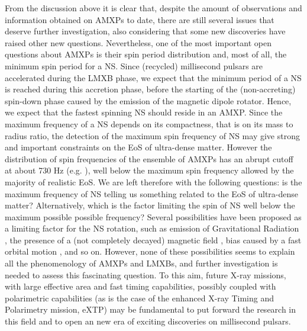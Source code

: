 \documentclass[graybox]{svmult}
\begin{document}
From the discussion above it is clear that, despite the amount of observations and information obtained on AMXPs to date, there are still several issues that deserve further investigation, also considering that some new discoveries have raised other new questions. Nevertheless, one of the most important open questions about AMXPs is their spin period distribution and, most of all, the minimum spin period for a NS. Since (recycled) millisecond pulsars are accelerated during the LMXB phase, we expect that the minimum period of a NS is reached during this accretion phase, before the starting of the (non-accreting) spin-down phase caused by the emission of the magnetic dipole rotator. Hence, we expect that the fastest spinning NS should reside in an AMXP. Since the maximum frequency of a NS depends on its compactness, that is on its mass to radius ratio, the detection of the maximum spin frequency of NS may give strong and important constraints on the EoS of ultra-dense matter.
However the distribution of spin frequencies of the ensemble of AMXPs has an abrupt cutoff at about 730 Hz (e.g. \cite{Patruno2017b}), well below the maximum spin frequency allowed by the majority of realistic EoS. We are left therefore with the following questions: is the maximum frequency of NS telling us something related to the EoS of ultra-dense matter? Alternatively, which is the factor limiting the spin of NS well below the maximum possible possible frequency? Several possibilities have been proposed as a limiting factor for the NS rotation, such as emission of Gravitational Radiation \cite{Hartman2011,Papitto2011b}, the presence of a (not completely decayed) magnetic field \cite{ Patruno2012}, bias caused by a fast orbital motion \cite{Burderi2001}, and so on. However, none of these possibilities seems to explain all the phenomenology of AMXPs and LMXBs, and further investigation is needed to assess this fascinating question. To this aim, future X-ray missions, with large effective area and fast timing capabilities, possibly coupled with polarimetric capabilities (as is the case of the enhanced X-ray Timing and Polarimetry mission, eXTP) may be fundamental to put forward the research in this field and to open an new era of exciting discoveries on millisecond pulsars.    
\end{document}
